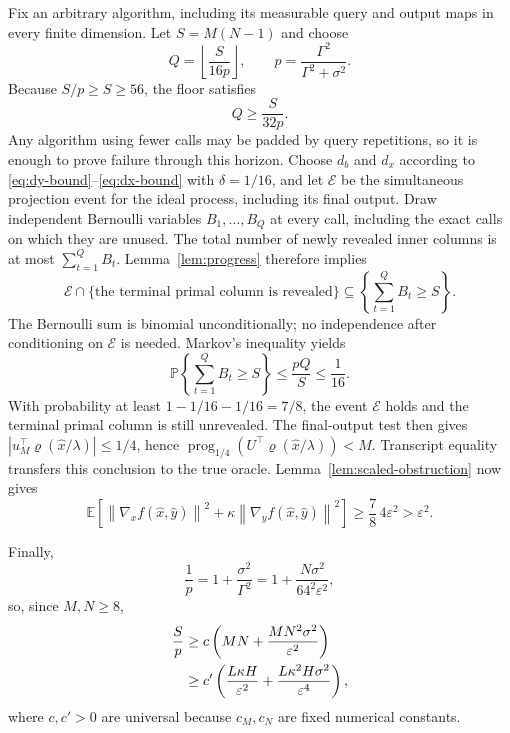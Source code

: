 \documentclass[11pt,a4paper]{article}
\newcommand{\E}{\mathbb E}
\newcommand{\Pp}{\mathbb P}
\newcommand{\eps}{\varepsilon}
\newcommand{\norm}[1]{\left\lVert #1\right\rVert}
\newcommand{\prog}{\operatorname{prog}}
\theoremstyle{definition}
\theoremstyle{remark}
\numberwithin{equation}{section}
\begin{document}
Fix an arbitrary algorithm, including its measurable query and output
maps in every finite dimension. Let $S=M(N-1)$ and choose
\begin{equation}
 Q=\left\lfloor\frac{S}{16p}\right\rfloor,
 \qquad
 p=\frac{\Gamma^2}{\Gamma^2+\sigma^2}.
 \label{eq:Qchoice}
\end{equation}
Because $S/p\ge S\ge56$, the floor satisfies
\begin{equation}
 Q\ge\frac{S}{32p}.
 \label{eq:Q-floor-lower}
\end{equation}
Any algorithm using fewer calls may be padded by query repetitions, so it is enough to prove failure through this horizon.  Choose $d_b$ and $d_x$ according to
\eqref{eq:dy-bound}--\eqref{eq:dx-bound} with $\delta=1/16$, and let
$\mathcal E$ be the simultaneous projection event for the ideal
process, including its final output.  Draw independent Bernoulli
variables $B_1,\ldots,B_Q$ at every call, including the exact calls on
which they are unused.  The total number of newly revealed inner
columns is at most $\sum_{t=1}^Q B_t$.  Lemma~\ref{lem:progress}
therefore implies
\[
 \mathcal E\cap\{\text{the terminal primal column is revealed}\}
 \subseteq
 \left\{\sum_{t=1}^Q B_t\ge S\right\}.
\]
The Bernoulli sum is binomial unconditionally; no independence after
conditioning on $\mathcal E$ is needed.  Markov's inequality yields
\begin{equation}
 \Pp\!\left\{\sum_{t=1}^Q B_t\ge S\right\}
 \le\frac{pQ}{S}\le\frac1{16}.
 \label{eq:markov-progress}
\end{equation}
With probability at least $1-1/16-1/16=7/8$, the event
$\mathcal E$ holds and the terminal primal column is still unrevealed.
The final-output test then gives
$|u_M^\top\varrho(\widehat x/\lambda)|\le1/4$, hence
$\prog_{1/4}(U^\top\varrho(\widehat x/\lambda))<M$.
Transcript equality transfers this conclusion to the true oracle.
Lemma~\ref{lem:scaled-obstruction} now gives
\[
 \E\!\left[
  \norm{\nabla_xf(\widehat x,\widehat y)}^2
  +\kappa\norm{\nabla_yf(\widehat x,\widehat y)}^2
 \right]\ge\frac78\,4\eps^2>\eps^2.
\]

Finally,
\begin{equation}
 \frac1p=1+\frac{\sigma^2}{\Gamma^2}
 =1+\frac{N\sigma^2}{64^2\eps^2},
 \label{eq:pinv}
\end{equation}
so, since $M,N\ge8$,
\begin{align}
 \frac{S}{p}
 &\ge c\left(MN+\frac{MN^2\sigma^2}{\eps^2}\right)\notag\\
 &\ge c'\left(
  \frac{L\kappa H}{\eps^2}
  +\frac{L\kappa^2H\sigma^2}{\eps^4}
 \right),
 \label{eq:final-rate}
\end{align}
where $c,c'>0$ are universal because $c_M,c_N$ are fixed numerical constants.
\end{document}
